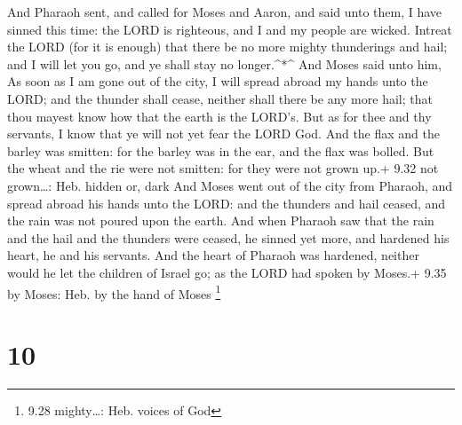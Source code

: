  And Pharaoh sent, and called for Moses and Aaron, and said
unto them, I have sinned this time: the LORD is righteous, and I and my
people are wicked.  Intreat the LORD (for it is enough)
that there be no more mighty thunderings and hail; and I will let you
go, and ye shall stay no longer.\^{}*\^{}  And Moses said
unto him, As soon as I am gone out of the city, I will spread abroad my
hands unto the LORD; and the thunder shall cease, neither shall there be
any more hail; that thou mayest know how that the earth is the LORD's.
 But as for thee and thy servants, I know that ye will not
yet fear the LORD God.  And the flax and the barley was
smitten: for the barley was in the ear, and the flax was bolled.
 But the wheat and the rie were not smitten: for they were
not grown up.+ 9.32 not grown\ldots: Heb. hidden or, dark 
And Moses went out of the city from Pharaoh, and spread abroad his hands
unto the LORD: and the thunders and hail ceased, and the rain was not
poured upon the earth.  And when Pharaoh saw that the rain
and the hail and the thunders were ceased, he sinned yet more, and
hardened his heart, he and his servants.  And the heart of
Pharaoh was hardened, neither would he let the children of Israel go; as
the LORD had spoken by Moses.+ 9.35 by Moses: Heb. by the hand of Moses
\footnote{9.28 mighty\ldots: Heb. voices of God}

\hypertarget{section-9}{%
\section{10}\label{section-9}}

